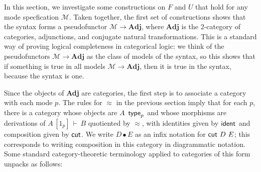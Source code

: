 \documentclass{drl-common/llncs}
\newcommand{\M}{\ensuremath{\mathcal{M}}}
\newcommand{\Adj}{\textbf{Adj}}
\renewcommand\wftp[2]{\ensuremath{#1 \,\,\, \dsd{type}_{#2}}}
\newcommand\seq[3]{\ensuremath{#1 \, [ #2 ] \, \vdash \, #3}}
\newcommand\ident[1]{\ensuremath{\dsd{ident}_{#1}}}
\newcommand\cutsym{\ensuremath{\dsd{cut}}}
\newcommand\cut[2]{\ensuremath{{\cutsym \,\, #1 \,\, #2}}}
\newcommand\cuti{\ensuremath{\bullet}}
\newcommand\ap[2]{\ensuremath{#1 \approx #2}}
\begin{document}
In this section, we investigate some constructions on $F$ and $U$ that
hold for any mode specfication $\M$.  Taken together, the first set of
constructions shows that the syntax forms a pseudofunctor $\M \to \Adj$,
where $\Adj$ is the 2-category of categories, adjunctions, and conjugate
natural transformations.  This is a standard way of proving logical
completeness in categorical logic: we think of the pseudofunctors $\M
\to \Adj$ as the class of models of the syntax, so this shows that if
something is true in all models $\M \to \Adj$, then it is true in the
syntax, because the syntax is one.  

Since the objects of \Adj\/ are categories,
the first step is to associate a category with each mode $p$.  The rules
for $\ap{}{}$ in the previous section imply that for each $p$, there is
a category whose objects are \wftp{A}{p} and whose morphisms are
derivations of \seq{A}{1_p}{B} quotiented by $\ap{}{}$, with identities
given by \ident{} and composition given by \cutsym.  We write $D \cuti
E$ as an infix notation for \cut{D}{E}; this corresponds to writing
composition in this category in diagrammatic notation. Some standard
category-theoretic terminology applied to categories of this form
unpacks as follows:
\end{document}
